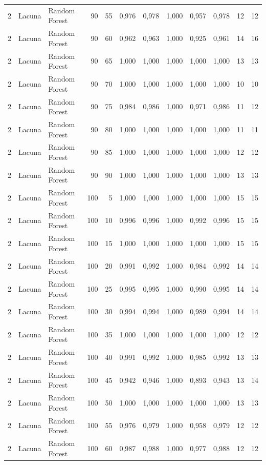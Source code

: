 \begin{longtable}{@{}rllrrrrrrrrr@{}}
2 & Lacuna & Random Forest & 90 & 55 & 0,976 & 0,978 & 1,000 & 0,957 & 0,978 & 12 & 12 \\
2 & Lacuna & Random Forest & 90 & 60 & 0,962 & 0,963 & 1,000 & 0,925 & 0,961 & 14 & 16 \\
2 & Lacuna & Random Forest & 90 & 65 & 1,000 & 1,000 & 1,000 & 1,000 & 1,000 & 13 & 13 \\
2 & Lacuna & Random Forest & 90 & 70 & 1,000 & 1,000 & 1,000 & 1,000 & 1,000 & 10 & 10 \\
2 & Lacuna & Random Forest & 90 & 75 & 0,984 & 0,986 & 1,000 & 0,971 & 0,986 & 11 & 12 \\
2 & Lacuna & Random Forest & 90 & 80 & 1,000 & 1,000 & 1,000 & 1,000 & 1,000 & 11 & 11 \\
2 & Lacuna & Random Forest & 90 & 85 & 1,000 & 1,000 & 1,000 & 1,000 & 1,000 & 12 & 12 \\
2 & Lacuna & Random Forest & 90 & 90 & 1,000 & 1,000 & 1,000 & 1,000 & 1,000 & 13 & 13 \\
2 & Lacuna & Random Forest & 100 & 5 & 1,000 & 1,000 & 1,000 & 1,000 & 1,000 & 15 & 15 \\
2 & Lacuna & Random Forest & 100 & 10 & 0,996 & 0,996 & 1,000 & 0,992 & 0,996 & 15 & 15 \\
2 & Lacuna & Random Forest & 100 & 15 & 1,000 & 1,000 & 1,000 & 1,000 & 1,000 & 15 & 15 \\
2 & Lacuna & Random Forest & 100 & 20 & 0,991 & 0,992 & 1,000 & 0,984 & 0,992 & 14 & 14 \\
2 & Lacuna & Random Forest & 100 & 25 & 0,995 & 0,995 & 1,000 & 0,990 & 0,995 & 14 & 14 \\
2 & Lacuna & Random Forest & 100 & 30 & 0,994 & 0,994 & 1,000 & 0,989 & 0,994 & 14 & 14 \\
2 & Lacuna & Random Forest & 100 & 35 & 1,000 & 1,000 & 1,000 & 1,000 & 1,000 & 12 & 12 \\
2 & Lacuna & Random Forest & 100 & 40 & 0,991 & 0,992 & 1,000 & 0,985 & 0,992 & 13 & 13 \\
2 & Lacuna & Random Forest & 100 & 45 & 0,942 & 0,946 & 1,000 & 0,893 & 0,943 & 13 & 14 \\
2 & Lacuna & Random Forest & 100 & 50 & 1,000 & 1,000 & 1,000 & 1,000 & 1,000 & 13 & 13 \\
2 & Lacuna & Random Forest & 100 & 55 & 0,976 & 0,979 & 1,000 & 0,958 & 0,979 & 12 & 12 \\
2 & Lacuna & Random Forest & 100 & 60 & 0,987 & 0,988 & 1,000 & 0,977 & 0,988 & 12 & 12 \\

\end{longtable}
